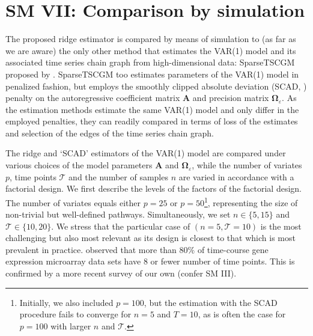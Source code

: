 \documentclass[a4paper,11pt]{article}
\date{}
\begin{document}
\section*{SM VII: Comparison by simulation}
The proposed ridge estimator is compared by means of simulation to (as far as we are aware) the only other method that estimates the VAR(1) model and its associated time series chain graph from high-dimensional data: SparseTSCGM proposed by \cite{Abeg2013}. SparseTSCGM too estimates parameters of the VAR(1) model in penalized fashion, but employs the smoothly clipped absolute deviation (SCAD, \citealp{Fan2001}) penalty on the autoregressive coefficient matrix $\mathbf{A}$ and precision matrix $\mathbf{\Omega}_{\varepsilon}$. As the estimation methods estimate the same VAR(1) model and only differ in the employed penalties, they can readily compared in terms of loss of the estimates and selection of the edges of the time series chain graph.

The ridge and `SCAD' estimators of the VAR(1) model are compared under various choices of the model parameters $\mathbf{A}$ and $\mathbf{\Omega}_{\varepsilon}$, while the number of variates $p$, time points $\mathcal{T}$ and the number of samples $n$ are varied in accordance with a factorial design. We first describe the levels of the factors of the factorial design. The number of variates equals either $p=25$ or $p=50$\footnote{Initially, we also included $p=100$, but the estimation with the SCAD procedure fails to converge for $n=5$ and $T=10$, as is often the case for $p=100$ with larger $n$ and $\mathcal{T}$.}, representing the size of non-trivial but well-defined pathways. Simultaneously, we set $n \in \{5, 15\}$ and $\mathcal{T} \in \{10, 20\}$. We stress that the particular case of $(n=5, \mathcal{T}=10)$ is the most challenging but also most relevant as its design is closest to that which is most prevalent in practice. \cite{Ernst2005} observed that more than $80\%$ of time-course gene expression microarray data sets have 8 or fewer number of time points. This is confirmed by a more recent survey of our own (confer SM III).
\end{document}
